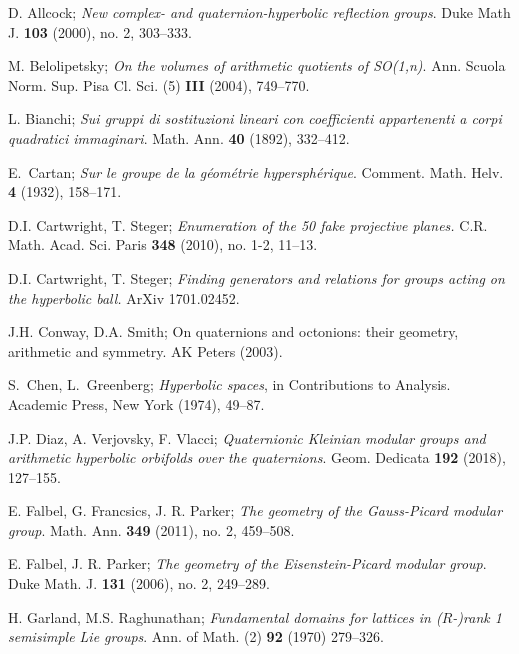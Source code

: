 \documentclass{article}[12pt]
\begin{document}
\raggedright
\frenchspacing
\begin{thebibliography}{ZZ99}

 D. Allcock; {\sl  New complex- and quaternion-hyperbolic reflection groups}. Duke Math J. {\bf 103} (2000), no. 2, 303--333.

 M. Belolipetsky; {\sl On the volumes of arithmetic quotients of SO(1,n)}. Ann. Scuola Norm. Sup. Pisa Cl. Sci. (5) {\bf III} (2004), 749--770.
  
 L. Bianchi; {\sl Sui gruppi di sostituzioni lineari con coefficienti appartenenti a corpi quadratici immaginari}. Math. Ann. {\bf 40} (1892), 332--412.

 E.~Cartan; {\sl Sur le groupe de la g\'eom\'etrie hypersph\'erique}. Comment. Math. Helv. {\bf 4} (1932), 158--171.

 D.I. Cartwright, T. Steger; {\sl Enumeration of the 50 fake projective planes.}  C.R. Math. Acad. Sci. Paris {\bf 348} (2010), no. 1-2, 11--13.

 D.I. Cartwright, T. Steger; {\sl Finding generators and relations for groups acting on the hyperbolic ball.} ArXiv 1701.02452.


 J.H. Conway, D.A. Smith; On quaternions and octonions: their geometry, arithmetic and symmetry. AK Peters (2003).
  
 S.~Chen, L.~Greenberg; {\sl Hyperbolic spaces}, in Contributions to Analysis. Academic Press, New York (1974), 49--87.

 J.P. Diaz, A. Verjovsky, F. Vlacci; {\sl Quaternionic Kleinian modular groups and arithmetic hyperbolic orbifolds over the quaternions}. Geom. Dedicata {\bf 192} (2018), 127--155.

 E. Falbel, G. Francsics, J. R. Parker; {\sl The geometry of the Gauss-Picard modular group}. Math. Ann. {\bf 349} (2011), no. 2, 459--508. 


 E. Falbel, J. R. Parker; {\sl The geometry of the Eisenstein-Picard modular group}. Duke Math. J. {\bf 131} (2006), no. 2, 249--289.

 H. Garland, M.S. Raghunathan; {\sl Fundamental domains for lattices in ($R$-)rank 1 semisimple Lie groups}. Ann. of Math. (2) {\bf 92} (1970) 279--326.


\end{thebibliography}
\end{document}
